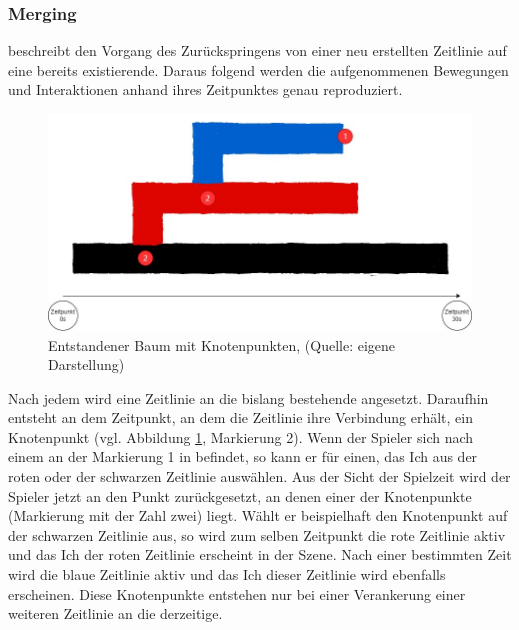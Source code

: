 \subsubsection{Merging}\label{sec:merge}
 beschreibt den Vorgang des Zurückspringens von einer neu erstellten Zeitlinie auf eine bereits existierende. Daraus folgend werden die aufgenommenen Bewegungen und Interaktionen anhand ihres Zeitpunktes genau reproduziert.
\begin{figure}[ht]
\centering
\includegraphics[width=0.7\linewidth]{content/pictures/merge_definition_grafik.jpg}
\caption{Entstandener Baum mit Knotenpunkten, (Quelle: eigene Darstellung)}
\label{fig:merge-definition}
\end{figure}
Nach jedem  wird eine  Zeitlinie an die bislang bestehende angesetzt. Daraufhin entsteht an dem Zeitpunkt, an dem die Zeitlinie ihre Verbindung erhält, ein Knotenpunkt (vgl. Abbildung \ref{fig:merge-definition}, Markierung 2). Wenn der Spieler sich nach einem  an der Markierung 1 in  befindet, so kann er für einen,  das Ich aus der roten oder der schwarzen Zeitlinie auswählen. Aus der Sicht der Spielzeit wird der Spieler jetzt an den Punkt zurückgesetzt, an denen einer der Knotenpunkte (Markierung mit der Zahl zwei) liegt. Wählt er beispielhaft den Knotenpunkt auf der schwarzen Zeitlinie aus, so wird zum selben Zeitpunkt die rote Zeitlinie aktiv und das Ich der roten Zeitlinie erscheint in der Szene. Nach einer bestimmten Zeit wird die blaue Zeitlinie aktiv und das Ich dieser Zeitlinie wird ebenfalls erscheinen. Diese Knotenpunkte entstehen nur bei einer Verankerung einer weiteren Zeitlinie an die derzeitige. 

